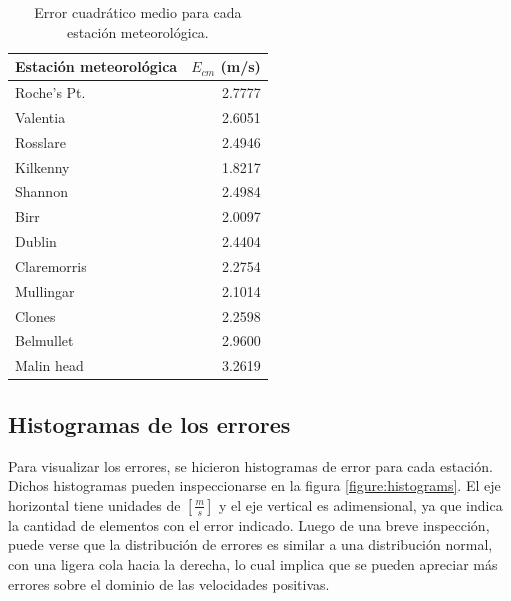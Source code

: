 \documentclass[journal, monochrome]{IEEEtran}
\begin{document}
\begin{table}
	\begin{center}
		\begin{tabular}{l|r}
			Estación meteorológica & $E_{cm}$ (m/s) \\
			\hline
			Roche's Pt. & 2.7777 \\ 
			Valentia & 2.6051 \\
			Rosslare & 2.4946 \\
			Kilkenny & 1.8217 \\
			Shannon & 2.4984 \\
			Birr & 2.0097 \\
			Dublin & 2.4404 \\
			Claremorris & 2.2754 \\
			Mullingar & 2.1014 \\
			Clones & 2.2598 \\
			Belmullet & 2.9600 \\
			Malin head & 3.2619 \\
		\end{tabular}
		\caption{Error cuadrático medio para cada estación meteorológica.}
		\label{table:ecm}
	\end{center}
\end{table}


\vspace{0.5cm}
\subsection{Histogramas de los errores}

Para visualizar los errores, se hicieron histogramas de error para cada estación. Dichos histogramas pueden inspeccionarse en la figura \ref{figure:histograms}. El eje horizontal tiene unidades de $[\frac{m}{s}]$ y el eje vertical es adimensional, ya que indica la cantidad de elementos con el error indicado. Luego de una breve inspección, puede verse que la distribución de errores es similar a una distribución normal, con una ligera cola hacia la derecha, lo cual implica que se pueden apreciar más errores sobre el dominio de las velocidades positivas.
\end{document}
